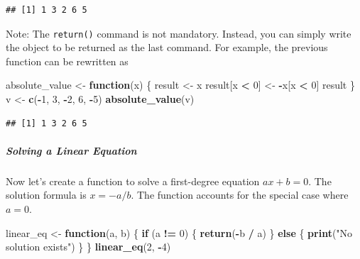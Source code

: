 \documentclass[
]{article}
\newenvironment{Shaded}{\begin{snugshade}}{\end{snugshade}}
\newcommand{\ControlFlowTok}[1]{\textcolor[rgb]{0.13,0.29,0.53}{\textbf{#1}}}
\newcommand{\DecValTok}[1]{\textcolor[rgb]{0.00,0.00,0.81}{#1}}
\newcommand{\FunctionTok}[1]{\textcolor[rgb]{0.13,0.29,0.53}{\textbf{#1}}}
\newcommand{\NormalTok}[1]{#1}
\newcommand{\OtherTok}[1]{\textcolor[rgb]{0.56,0.35,0.01}{#1}}
\newcommand{\SpecialCharTok}[1]{\textcolor[rgb]{0.81,0.36,0.00}{\textbf{#1}}}
\newcommand{\StringTok}[1]{\textcolor[rgb]{0.31,0.60,0.02}{#1}}
\begin{document}
\begin{verbatim}
## [1] 1 3 2 6 5
\end{verbatim}

Note: The \texttt{return()} command is not mandatory. Instead, you can
simply write the object to be returned as the last command. For example,
the previous function can be rewritten as

\begin{Shaded}
\begin{Highlighting}[]
\NormalTok{absolute\_value }\OtherTok{\textless{}{-}} \ControlFlowTok{function}\NormalTok{(x) \{}
\NormalTok{  result }\OtherTok{\textless{}{-}}\NormalTok{ x}
\NormalTok{  result[x }\SpecialCharTok{\textless{}} \DecValTok{0}\NormalTok{] }\OtherTok{\textless{}{-}} \SpecialCharTok{{-}}\NormalTok{x[x }\SpecialCharTok{\textless{}} \DecValTok{0}\NormalTok{]}
\NormalTok{  result}
\NormalTok{\}}
\NormalTok{v }\OtherTok{\textless{}{-}} \FunctionTok{c}\NormalTok{(}\SpecialCharTok{{-}}\DecValTok{1}\NormalTok{, }\DecValTok{3}\NormalTok{, }\SpecialCharTok{{-}}\DecValTok{2}\NormalTok{, }\DecValTok{6}\NormalTok{, }\SpecialCharTok{{-}}\DecValTok{5}\NormalTok{)}
\FunctionTok{absolute\_value}\NormalTok{(v)}
\end{Highlighting}
\end{Shaded}

\begin{verbatim}
## [1] 1 3 2 6 5
\end{verbatim}

\hypertarget{solving-a-linear-equation}{%
\subparagraph{Solving a Linear
Equation}\label{solving-a-linear-equation}}

Now let's create a function to solve a first-degree equation
\(ax + b = 0\). The solution formula is \(x=-a/b\). The function
accounts for the special case where \(a=0\).

\begin{Shaded}
\begin{Highlighting}[]
\NormalTok{linear\_eq }\OtherTok{\textless{}{-}} \ControlFlowTok{function}\NormalTok{(a, b) \{}
  \ControlFlowTok{if}\NormalTok{ (a }\SpecialCharTok{!=} \DecValTok{0}\NormalTok{) \{}
    \FunctionTok{return}\NormalTok{(}\SpecialCharTok{{-}}\NormalTok{b }\SpecialCharTok{/}\NormalTok{ a)}
\NormalTok{  \} }\ControlFlowTok{else}\NormalTok{ \{}
    \FunctionTok{print}\NormalTok{(}\StringTok{"No solution exists"}\NormalTok{)}
\NormalTok{  \}}
\NormalTok{\}}
\FunctionTok{linear\_eq}\NormalTok{(}\DecValTok{2}\NormalTok{, }\SpecialCharTok{{-}}\DecValTok{4}\NormalTok{)}
\end{Highlighting}
\end{Shaded}
\end{document}
